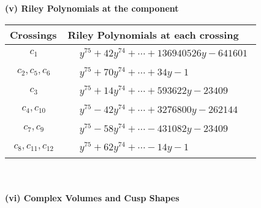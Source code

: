 \documentclass[1p]{elsarticle_modified}
\theoremstyle{definition}
\begin{document}
\newpage\renewcommand{\arraystretch}{1}
\flushleft \textbf{(v) Riley Polynomials at the component}\newline \\
\begin{tabular}{m{50pt}|m{274pt}}
Crossings & \hspace{64pt}Riley Polynomials at each crossing \\
\hline $$\begin{aligned}c_{1}\end{aligned}$$&$\begin{aligned}
&y^{75}+42 y^{74}+\cdots+136940526 y-641601
\end{aligned}$\\
\hline $$\begin{aligned}c_{2},c_{5},c_{6}\end{aligned}$$&$\begin{aligned}
&y^{75}+70 y^{74}+\cdots+34 y-1
\end{aligned}$\\
\hline $$\begin{aligned}c_{3}\end{aligned}$$&$\begin{aligned}
&y^{75}+14 y^{74}+\cdots+593622 y-23409
\end{aligned}$\\
\hline $$\begin{aligned}c_{4},c_{10}\end{aligned}$$&$\begin{aligned}
&y^{75}-42 y^{74}+\cdots+3276800 y-262144
\end{aligned}$\\
\hline $$\begin{aligned}c_{7},c_{9}\end{aligned}$$&$\begin{aligned}
&y^{75}-58 y^{74}+\cdots-431082 y-23409
\end{aligned}$\\
\hline $$\begin{aligned}c_{8},c_{11},c_{12}\end{aligned}$$&$\begin{aligned}
&y^{75}+62 y^{74}+\cdots-14 y-1
\end{aligned}$\\
\hline
\end{tabular}\\~\\
\newpage\flushleft \textbf{(vi) Complex Volumes and Cusp Shapes}
\end{document}
